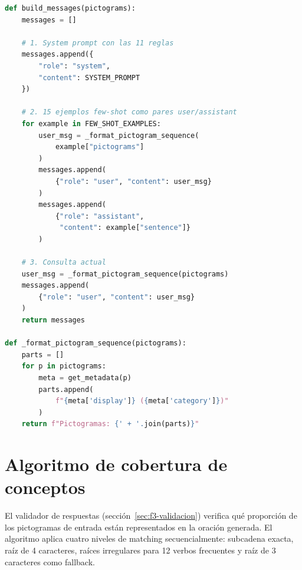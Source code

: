 \begin{lstlisting}[language=Python,caption={Construcción de mensajes para la API (\texttt{prompt\_builder.py}).},label={lst:prompt-builder},basicstyle=\ttfamily\small,xleftmargin=1cm]
def build_messages(pictograms):
    messages = []

    # 1. System prompt con las 11 reglas
    messages.append({
        "role": "system",
        "content": SYSTEM_PROMPT
    })

    # 2. 15 ejemplos few-shot como pares user/assistant
    for example in FEW_SHOT_EXAMPLES:
        user_msg = _format_pictogram_sequence(
            example["pictograms"]
        )
        messages.append(
            {"role": "user", "content": user_msg}
        )
        messages.append(
            {"role": "assistant",
             "content": example["sentence"]}
        )

    # 3. Consulta actual
    user_msg = _format_pictogram_sequence(pictograms)
    messages.append(
        {"role": "user", "content": user_msg}
    )
    return messages

def _format_pictogram_sequence(pictograms):
    parts = []
    for p in pictograms:
        meta = get_metadata(p)
        parts.append(
            f"{meta['display']} ({meta['category']})"
        )
    return f"Pictogramas: {' + '.join(parts)}"
\end{lstlisting}

\section{Algoritmo de cobertura de conceptos}

El validador de respuestas (sección~\ref{sec:f3-validacion}) verifica qué proporción de los pictogramas de entrada están representados en la oración generada. El algoritmo aplica cuatro niveles de matching secuencialmente: subcadena exacta, raíz de 4 caracteres, raíces irregulares para 12 verbos frecuentes y raíz de 3 caracteres como fallback.

